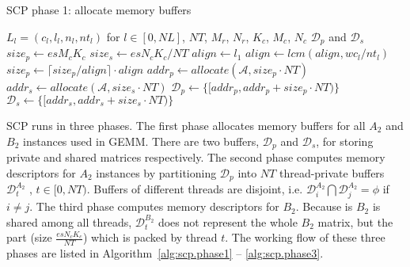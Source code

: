 \begin{algorithm}
  \caption{SCP phase 1: allocate memory buffers}
  \label{alg:scp.phase1}
  \begin{algorithmic}[1]
    \REQUIRE $L_l = (c_l,l_l,n_l,nt_l)$ for $l \in [0, NL]$, $NT$,
    $M_r$, $N_r$, $K_c$, $M_c$, $N_c$
    \ENSURE $\mathcal{D}_p$ and $\mathcal{D}_s$
    \STATE $size_p \gets es M_c K_c$ \label{line:size.p}
    \STATE $size_s \gets es N_c K_c / NT$ \label{line:size.s}
    \STATE $align \gets l_1$ \label{line:align.init}
     \label{line:align.for}
     \label{line:align.type}
    \STATE $align \gets lcm(align, wc_l / nt_l)$ \label{line:align.update}
    \ENDIF
    \ENDFOR \label{line:align.endfor}
    \STATE $size_p \gets \lceil size_p / align \rceil \cdot align$ \label{line:align}
    \STATE $addr_p \gets allocate(\mathcal{A}, size_p \cdot NT)$ \label{line:alloc.begin}
    \STATE $addr_s \gets allocate(\mathcal{A}, size_s \cdot NT)$ \label{line:alloc.end}
    \STATE $\mathcal{D}_p \gets \lbrace [addr_p, addr_p + size_p \cdot NT) \rbrace$ \label{line:d.begin}
    \STATE $\mathcal{D}_s \gets \lbrace [addr_s, addr_s + size_s \cdot NT) \rbrace$ \label{line:d.end}
  \end{algorithmic}
\end{algorithm}

SCP runs in three phases.
The first phase allocates memory buffers for all $A_2$ and $B_2$
instances used in GEMM. There are two buffers, $\mathcal{D}_p$ and $\mathcal{D}_s$,
for storing private and shared matrices respectively.
The second phase computes memory descriptors for $A_2$ instances
by partitioning $\mathcal{D}_p$ into $NT$ thread-private buffers
$\mathcal{D}_t^{A_2}$ , $t \in [0, NT)$.
Buffers of different threads are disjoint,
i.e. $\mathcal{D}_i^{A_2} \bigcap \mathcal{D}_j^{A_2} = \phi$ if $i \ne j$.
The third phase computes memory descriptors for $B_2$.
Because is $B_2$ is shared among all threads,
$\mathcal{D}_t^{B_2}$ does not represent the whole $B_2$ matrix,
but the part (size $\frac{es N_c K_c}{NT}$) which is packed by thread $t$.
The working flow of these three phases are listed
in Algorithm~\ref{alg:scp.phase1} -- \ref{alg:scp.phase3}.

